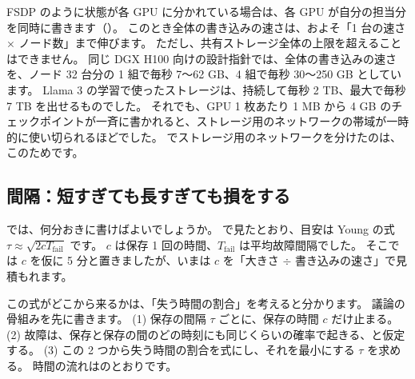 FSDP のように状態が各 GPU に分かれている場合は、各 GPU が自分の担当分を同時に書きます（）。
このとき全体の書き込みの速さは、およそ「1 台の速さ $\times$ ノード数」まで伸びます。
ただし、共有ストレージ全体の上限を超えることはできません。
同じ DGX H100 向けの設計指針では、全体の書き込みの速さを、ノード 32 台分の 1 組で毎秒 7〜62 GB、4 組で毎秒 30〜250 GB としています。
Llama 3 の学習で使ったストレージは、持続して毎秒 2 TB、最大で毎秒 7 TB を出せるものでした\cite{dubey2024llama3}。
それでも、GPU 1 枚あたり 1 MB から 4 GB のチェックポイントが一斉に書かれると、ストレージ用のネットワークの帯域が一時的に使い切られるほどでした。
でストレージ用のネットワークを分けたのは、このためです。

\subsection*{間隔：短すぎても長すぎても損をする}

では、何分おきに書けばよいでしょうか。
で見たとおり、目安は Young の式~\cite{young1974first,daly2006higher} $\tau\approx\sqrt{2cT_{\mathrm{fail}}}$ です。
$c$ は保存 1 回の時間、$T_{\mathrm{fail}}$ は平均故障間隔でした。
そこでは $c$ を仮に 5 分と置きましたが、いまは $c$ を「大きさ $\div$ 書き込みの速さ」で見積もれます。

この式がどこから来るかは、「失う時間の割合」を考えると分かります。
議論の骨組みを先に書きます。
(1) 保存の間隔 $\tau$ ごとに、保存の時間 $c$ だけ止まる。
(2) 故障は、保存と保存の間のどの時刻にも同じくらいの確率で起きる、と仮定する。
(3) この 2 つから失う時間の割合を式にし、それを最小にする $\tau$ を求める。
時間の流れはのとおりです。

